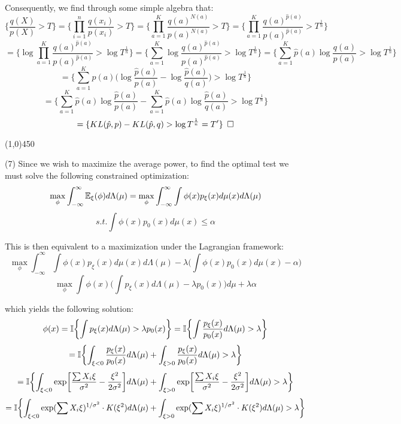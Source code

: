 \documentclass[12pt]{article}
\begin{document}
\noindent
Consequently, we find through some simple algebra that:
$$ \biggl\{ \frac{q(X)}{p(X)} > T \biggr\}
=  \biggl\{ \prod_{i=1}^n \frac{q(x_i)}{p(x_i)} > T \biggr\}
=  \biggl\{ \prod_{a=1}^K \frac{q(a)^{N(a)}}{p(a)^{N(a)}} > T \biggr\}
=  \biggl\{ \prod_{a=1}^K \frac{q(a)^{\hat{p}(a)}}{p(a)^{\hat{p}(a)}} > T^{\frac{1}{n}} \biggr\}$$
$$= \biggl\{ \log \prod_{a=1}^K \frac{q(a)^{\hat{p}(a)}}{p(a)^{\hat{p}(a)}} > \log T^{\frac{1}{n}} \biggr\}
= \biggl\{ \sum_{a=1}^K \log \frac{q(a)^{\hat{p}(a)}}{p(a)^{\hat{p}(a)}} > \log T^{\frac{1}{n}} \biggr\}
= \biggl\{ \sum_{a=1}^K \hat{p}(a) \log \frac{q(a)}{p(a)} > \log T^{\frac{1}{n}} \biggr\}$$
$$= \biggl\{ \sum_{a=1}^K  \hat{p}(a) \biggl( \log \frac{\hat{p}(a)}{p(a)}- \log \frac{\hat{p}(a)}{q(a)}\biggr) > \log T^{\frac{1}{n}} \biggr\}$$
$$= \biggl\{ \sum_{a=1}^K  \hat{p}(a) \log \frac{\hat{p}(a)}{p(a)}- \sum_{a=1}^K  \hat{p}(a)  \log \frac{\hat{p}(a)}{q(a)} > \log T^{\frac{1}{n}} \biggr\}$$
$$= \{ KL(\hat{p},p) - KL(\hat{p},q) > \log T^{\frac{1}{n}} = T' \} \hspace{5 pt} \square$$
\begin{center}
\line(1,0){450}
\end{center}

\pagebreak
\noindent
(7) Since we wish to maximize the average power, to find the optimal test we must solve the following constrained optimization:
$$\max_\phi \int_{-\infty}^{\infty} \mathbb{E}_\xi (\phi) d\Lambda(\mu)
= \max_\phi \int_{-\infty}^{\infty} \int \phi(x) p_\xi(x) d\mu(x) d\Lambda(\mu)$$
$$s.t. \int \phi(x) p_0(x) d\mu(x) \leq \alpha$$

\noindent
This is then equivalent to a maximization under the Lagrangian framework:
$$\max_\phi \int_{-\infty}^{\infty} \int \phi(x) p_\xi(x) d\mu(x) d\Lambda(\mu)-\lambda \biggl(\int \phi(x) p_0(x) d\mu(x) - \alpha \biggr)$$
$$\max_\phi \int \phi(x) \biggl( \int p_\xi(x) d\Lambda(\mu)-\lambda p_0(x) \biggr) d\mu + \lambda\alpha$$

\noindent
which yields the following solution:
$$\phi(x) = \mathbb{I}\biggl\{ \int p_\xi(x)d\Lambda(\mu) > \lambda p_0(x) \biggr\}
=  \mathbb{I}\biggl\{ \int \frac{p_\xi(x)}{p_0(x)} d\Lambda(\mu) > \lambda \biggr\}$$
$$= \mathbb{I}\biggl\{ \int_{\xi<0} \frac{p_\xi(x)}{p_0(x)} d\Lambda(\mu) + \int_{\xi>0}  \frac{p_\xi(x)}{p_0(x)} d\Lambda(\mu) > \lambda \biggr\}$$
$$= \mathbb{I}\biggl\{ \int_{\xi<0} \exp\biggl[ \frac{\sum X_i \xi}{\sigma^2}-\frac{\xi^2}{2\sigma^2} \biggr] d\Lambda(\mu) + \int_{\xi>0}  \exp\biggl[ \frac{\sum X_i \xi}{\sigma^2}-\frac{\xi^2}{2\sigma^2} \biggr] d\Lambda(\mu) > \lambda \biggr\}$$
$$= \mathbb{I}\biggl\{ \int_{\xi<0} \exp( \sum X_i \xi)^{1/\sigma^2}\cdot K(\xi^2) d\Lambda(\mu) + \int_{\xi>0}  \exp( \sum X_i \xi)^{1/\sigma^2}\cdot K(\xi^2) d\Lambda(\mu) > \lambda \biggr\}$$
\end{document}
